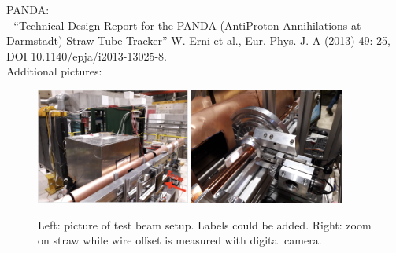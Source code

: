 PANDA:\\
- ``Technical Design Report for the PANDA (AntiProton Annihilations at Darmstadt) Straw Tube Tracker''
   W. Erni et al., Eur. Phys. J. A (2013) 49: 25, DOI 10.1140/epja/i2013-13025-8.\\



Additional pictures:


\begin{figure}[htb]
\begin{center}
\includegraphics[width=0.45\textwidth]{figs/DecaySpectrometer/SST_TB_setup_2017.png}
\includegraphics[width=0.45\textwidth]{figs/DecaySpectrometer/20170918_152403.jpg}
\caption{Left: picture of test beam setup. Labels could be added. 
         Right: zoom on straw while wire offset is measured with digital camera.}
\label{Fig:pictures_TB2017}
\end{center}
\end{figure}


